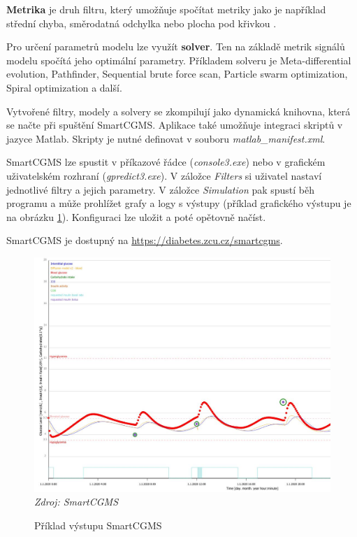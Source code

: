 \textbf{Metrika} je druh filtru, který umožňuje spočítat metriky jako je například střední chyba, směrodatná odchylka nebo plocha pod křivkou \citep{cgms.koutny}.

Pro určení parametrů modelu lze využít \textbf{solver}. Ten na základě metrik signálů modelu spočítá jeho optimální parametry. Příkladem solveru je Meta-differential evolution, Pathfinder, Sequential brute force scan, Particle swarm optimization, Spiral optimization a další.

Vytvořené filtry, modely a solvery se zkompilují jako dynamická knihovna, která se načte při spuštění SmartCGMS. Aplikace také umožňuje integraci skriptů v jazyce Matlab. Skripty je nutné definovat v souboru \textit{matlab\_manifest.xml}.

SmartCGMS lze spustit v příkazové řádce (\textit{console3.exe}) nebo v grafickém uživatelském rozhraní (\textit{gpredict3.exe}). V záložce \textit{Filters} si uživatel nastaví jednotlivé filtry a jejich parametry. V záložce \textit{Simulation} pak spustí běh programu a může prohlížet grafy a logy s výstupy (příklad grafického výstupu je na obrázku \ref{fig:scgms_graf}). Konfiguraci lze uložit a poté opětovně načíst.

SmartCGMS je dostupný na \url{https://diabetes.zcu.cz/smartcgms}.

\begin{figure}[H]
\caption{Příklad výstupu SmartCGMS}
\label{fig:scgms_graf}
\centering
\includegraphics[width=1\textwidth]{img/scgms/graf1.jpg}
\textit{Zdroj: SmartCGMS}
\end{figure}